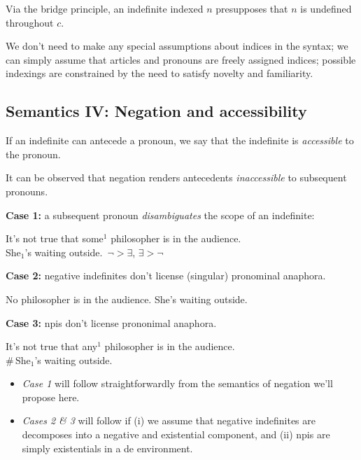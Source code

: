 \documentclass[nols,twoside,nofonts,nobib,nohyper]{tufte-handout}
\theoremstyle{definition}
\begin{document}
  Via the bridge principle, an indefinite indexed $n$ presupposes that $n$ is undefined throughout $c$.

  We don't need to make any special assumptions about indices in the syntax; we can simply assume that articles and pronouns are freely assigned indices; possible indexings are constrained by the need to satisfy novelty and familiarity.


  \subsection{Semantics IV: Negation and accessibility}

  If an indefinite can antecede a pronoun, we say that the indefinite is \textit{accessible} to the pronoun.

  It can be observed that negation renders antecedents \textit{inaccessible} to subsequent pronouns.

  \textbf{Case 1:} a subsequent pronoun \textit{disambiguates} the scope of an indefinite:

  \ex
  It's not true that some$^{1}$ philosopher is in the audience.\\
  She$_{1}$'s waiting outside.\hfill\xmark $¬ > ∃$, \cmark $∃ > ¬$
  \xe

  \textbf{Case 2:} negative indefinites don't license (singular) pronominal anaphora.

  \ex
  No philosopher is in the audience. She's waiting outside.
  \xe

  \textbf{Case 3:} \acp{npi} don't license prononimal anaphora.

  \ex
  It's not true that any$^{1}$ philosopher is in the audience.\\
  \#\,She$_{1}$'s waiting outside.
  \xe

  \begin{itemize}
    \item \textit{Case 1} will follow straightforwardly from the semantics of negation we'll propose here.
    \item \textit{Cases 2 \& 3} will follow if (i) we assume that negative indefinites are decomposes into a negative and existential component, and (ii) \acp{npi} are simply existentials in a \ac{de} environment.
  \end{itemize}
\end{document}
